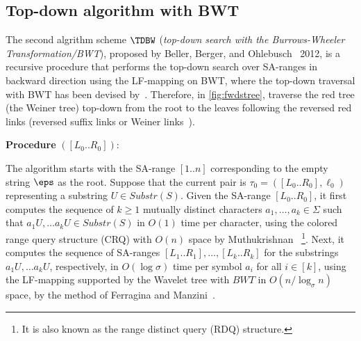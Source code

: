 \subsection{Top-down algorithm with BWT}
\label{sec:prev:tdbw}
The second algrithm scheme $\TDBW$ (\textit{top-down search with the Burrows-Wheeler Transformation/BWT}), proposed by Beller, Berger, and Ohlebusch~\cite{beller:berger2012space:efficient:bbo} 2012, is a recursive procedure that performs
the top-down search over SA-ranges in backward direction using the LF-mapping on BWT,
where the top-down traversal with BWT has been devised by~\cite{bellergogohlebusch2013computing,beller:berger2012space:efficient:bbo,belazzougui2015space:unusual,belazzougui2020linear}. 
Therefore, in \cref{fig:fwdstree}, \TDBW{} traverse the red tree (the Weiner tree) top-down from the root to the leaves following the reversed red links (reversed suffix links or Weiner links~\cite{gusfield1997algorithms}). 

{
  \setlength{\interspacetitleruled}{0pt}%
  \setlength{\algotitleheightrule}{0pt}%
  \begin{algorithm}[h]
  \textbf{Procedure} \TDBW$([L_0..R_0])$:\\
  \end{algorithm}
}  

The algorithm \TDBW{} starts with the SA-range $[1..n]$ corresponding to the empty string $\eps$ as the root. Suppose that the current pair is $\tau_0 = ([L_0..R_0], \ell_0)$ representing  a substring $U \in Substr(S)$.
Given the SA-range $[L_0..R_0]$, it first computes the sequence of $k\ge 1$ mutually distinct characters $a_1, \dots, a_k \in \Sigma$ such that $a_1 U, \dots a_k U \in Substr(S)$ in $O(1)$ time per character, using the colored range query structure (CRQ) with $O(n)$ space by Muthukrishnan~\cite{muthukrishnan2002efficient}%
\footnote{It is also known as the range distinct query (RDQ) structure.}.
Next, it computes the sequence of SA-ranges $[L_1..R_1], \dots, [L_k..R_k]$ for the substrings $a_1 U, \dots a_k U$, respectively, in $O(\log\sigma)$ time per symbol $a_i$ for all $i \in [k]$, using the LF-mapping supported by the Wavelet tree with $BWT$ in $O(n/\log_\sigma n)$ space, by the method of Ferragina and Manzini~\cite{Ferragina05:FM}.

